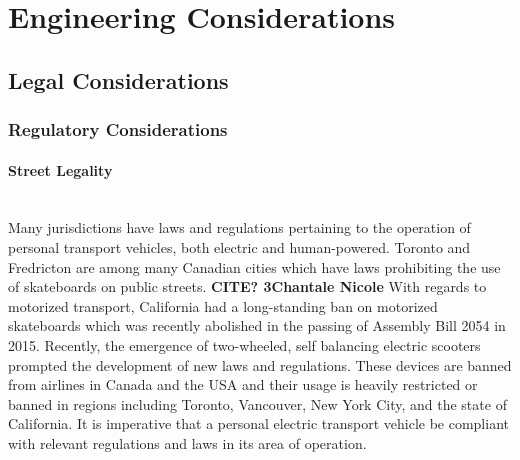 \section{Engineering Considerations}
\subsection{Legal Considerations}

\subsubsection{Regulatory Considerations}

\paragraph{Street Legality}\mbox{}\\
Many jurisdictions have laws and regulations pertaining to the operation of personal transport vehicles, both electric and human-powered. 
Toronto and Fredricton are among many Canadian cities which have laws prohibiting the use of skateboards on public streets. \textbf{CITE? 3Chantale Nicole}
With regards to motorized transport, California had a long-standing ban on motorized skateboards which was recently abolished in the passing of Assembly Bill 2054 in 2015. \cite{OCLaws} \cite{WSJLaws}
Recently, the emergence of two-wheeled, self balancing electric scooters prompted the development of new laws and regulations. 
These devices are banned from airlines in Canada and the USA and their usage is heavily restricted or banned in regions including Toronto, Vancouver, New York City, and the state of California. \cite{leetboard}
It is imperative that a personal electric transport vehicle be compliant with relevant regulations and laws in its area of operation.


